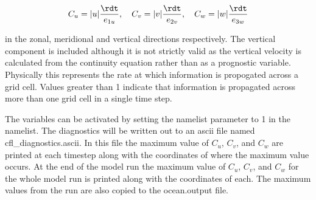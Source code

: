 \documentclass[../main/NEMO_manual]{subfiles}
\begin{document}
\[
  C_u = |u|\frac{\rdt}{e_{1u}}, \quad C_v = |v|\frac{\rdt}{e_{2v}}, \quad C_w = |w|\frac{\rdt}{e_{3w}}
\]

in the zonal, meridional and vertical directions respectively.
The vertical component is included although it is not strictly valid as the vertical velocity is calculated from
the continuity equation rather than as a prognostic variable.
Physically this represents the rate at which information is propogated across a grid cell.
Values greater than 1 indicate that information is propagated across more than one grid cell in a single time step.

The variables can be activated by setting the  namelist parameter to 1 in the  namelist.
The diagnostics will be written out to an ascii file named cfl\_diagnostics.ascii.
In this file the maximum value of $C_u$, $C_v$, and $C_w$ are printed at each timestep along with the coordinates of
where the maximum value occurs.
At the end of the model run the maximum value of $C_u$, $C_v$, and $C_w$ for the whole model run is printed along
with the coordinates of each.
The maximum values from the run are also copied to the ocean.output file.

\subinc{}
\end{document}

